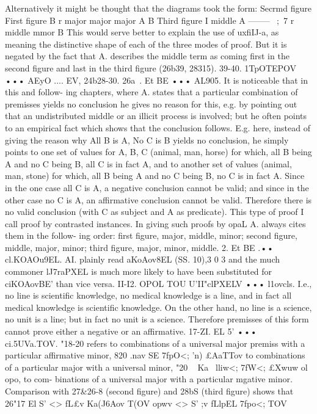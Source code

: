 {{{{Alternatively it might be thought that the diagrams took the
form:
Secrmd figure
First figure
B
r
major
major
major
A
B
Third figure
I middle
A --------
\
;~7
r
middle
mmor
B
This would serve better to explain the use of uxfiIJ-a, as meaning
the distinctive shape of each of the three modes of proof. But
it is negated by the fact that A. describes the middle term as
coming first in the second figure and last in the third figure
(26b39, 28315).
39-40. 1TpOTEPOV ••• AEyO .... EV, 24b28-30.
26a~. Et BE ••• AL905. It is noticeable that in this and follow-
ing chapters, where A. states that a particular combination of
premisses yields no conclusion he gives no reason for this, e.g. by
pointing out that an undistributed middle or an illicit process
is involved; but he often points to an empirical fact which shows
that the conclusion follows. E.g. here, instead of giving the
reason why All B is A, No C is B yields no conclusion, he simply
points to one set of values for A, B, C (animal, man, horse) for
which, all B being A and no C being B, all C is in fact A, and to
another set of values (animal, man, stone) for which, all B being
A and no C being B, no C is in fact A. Since in the one case all
C is A, a negative conclusion cannot be valid; and since in the
other case no C is A, an affirmative conclusion cannot be valid.
Therefore there is no valid conclusion (with C as subject and A
as predicate). This type of proof I call proof by contrasted
instances.
In giving such proofs by opaL A. always cites them in the follow-
ing order: first figure, major, middle, minor; second figure, middle,
major, minor; third figure, major, minor, middle.
2. Et BE .•• cl.KOAOu9EL. AI. plainly read aKoAov8EL (SS. 10),3 0 3
and the much commoner lJ7raPXEL is much more likely to have been
substituted for ciKOAovBE' than vice versa.
II-I2. OPOL TOU U'II"clPXELV ••• l1ovcls. I.e., no line is scientific
knowledge, no medical knowledge is a line, and in fact all medical
knowledge is scientific knowledge. On the other hand, no line
is a science, no unit is a line; but in fact no unit is a science.
Therefore premisses of this form cannot prove either a negative
or an affirmative.
17-ZI. EL 5' ••• ci.5UVa.TOV. "18-20 refers to combinations of
a universal major premiss with a particular affirmative minor,
820 .nav SE 7fpO<; 'n) £AaTTov to combinations of a particular major
with a universal minor, "20 ~ Ka~ lliw<; 7fW<; £Xwuw ol opo, to com-
binations of a universal major with a particular mgative minor.
Comparison with 27&26-8 (second figure) and 28bS (third figure)
shows that 26"17 El S' <> fL£v Ka(J6Aov T(OV opwv <> S' ;v fLlpEL 7fpo<; TOV
}}}}
